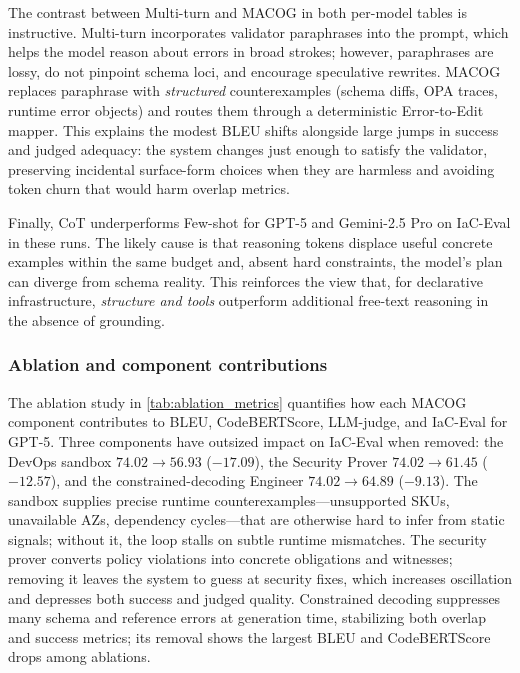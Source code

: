 \documentclass[manuscript,screen,nonacm]{acmart}
\begin{document}
The contrast between Multi-turn and MACOG in both per-model tables is instructive. Multi-turn incorporates validator paraphrases into the prompt, which helps the model reason about errors in broad strokes; however, paraphrases are lossy, do not pinpoint schema loci, and encourage speculative rewrites. MACOG replaces paraphrase with \emph{structured} counterexamples (schema diffs, OPA traces, runtime error objects) and routes them through a deterministic Error-to-Edit mapper. This explains the modest BLEU shifts alongside large jumps in success and judged adequacy: the system changes just enough to satisfy the validator, preserving incidental surface-form choices when they are harmless and avoiding token churn that would harm overlap metrics.

Finally, CoT underperforms Few-shot for GPT-5 and Gemini-2.5 Pro on IaC-Eval in these runs. The likely cause is that reasoning tokens displace useful concrete examples within the same budget and, absent hard constraints, the model’s plan can diverge from schema reality. This reinforces the view that, for declarative infrastructure, \emph{structure and tools} outperform additional free-text reasoning in the absence of grounding.

\subsubsection{Ablation and component contributions}

The ablation study in \autoref{tab:ablation_metrics} quantifies how each MACOG component contributes to BLEU, CodeBERTScore, LLM-judge, and IaC-Eval for GPT-5. Three components have outsized impact on IaC-Eval when removed: the DevOps sandbox \(74.02 \rightarrow 56.93\) (\(-17.09\)), the Security Prover \(74.02 \rightarrow 61.45\) (\(-12.57\)), and the constrained-decoding Engineer \(74.02 \rightarrow 64.89\) (\(-9.13\)). The sandbox supplies precise runtime counterexamples—unsupported SKUs, unavailable AZs, dependency cycles—that are otherwise hard to infer from static signals; without it, the loop stalls on subtle runtime mismatches. The security prover converts policy violations into concrete obligations and witnesses; removing it leaves the system to guess at security fixes, which increases oscillation and depresses both success and judged quality. Constrained decoding suppresses many schema and reference errors at generation time, stabilizing both overlap and success metrics; its removal shows the largest BLEU and CodeBERTScore drops among ablations.
\end{document}
